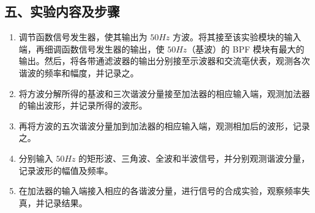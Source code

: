 \documentclass[dvipsnames, svgnames,a4paper,11pt]{article}
\begin{document}
\subsection*{五、实验内容及步骤}
\begin{enumerate}
  \item 调节函数信号发生器，使其输出为 $50Hz$ 方波。将其接至该实验模块的输入端，再细调函数信号发生器的输出，使 $50Hz$（基波）的 BPF 模块有最大的输出。然后，将各带通滤波器的输出分别接至示波器和交流亳伏表，观测各次谐波的频率和幅度，并记录之。
  \item 将方波分解所得的基波和三次谐波分量接至加法器的相应输入端，观测加法器的输出波形，并记录所得的波形。
  \item 再将方波的五次谐波分量加到加法器的相应输入端，观测相加后的波形，记录之。
  \item 分别输入 $50Hz$ 的矩形波、三角波、全波和半波信号，并分别观测谐波分量，记录波形的幅值及频率。
  \item 在加法器的输入端接入相应的各谐波分量，进行信号的合成实验，观察频率失真，并记录结果。
\end{enumerate}
\end{document}
